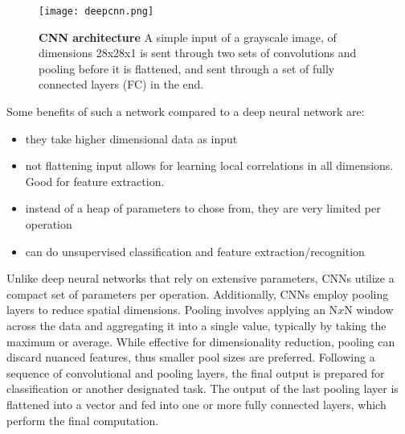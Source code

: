 \begin{figure}[H]
 \centering
 \texttt{[image: deepcnn.png]}
 \caption{\textbf{CNN architecture} A simple input of a grayscale image, of dimensions 28x28x1 is sent through two sets of convolutions and pooling before it is flattened, and sent through a set of fully connected layers (FC) in  the end.}
 \label{fig:cnn}
\end{figure}

Some benefits of such a network compared to a deep neural network are:
\begin{itemize}
 \item they take higher dimensional data as input
 \item not flattening input allows for learning local correlations in all dimensions. Good for feature extraction.
 \item instead of a heap of parameters to chose from, they are very limited per operation
 \item can do unsupervised classification and feature extraction/recognition
\end{itemize}

Unlike deep neural networks that rely on extensive parameters, CNNs utilize a compact set of parameters per operation. Additionally, CNNs employ pooling layers to reduce spatial dimensions. Pooling involves applying an N$x$N window across the data and aggregating it into a single value, typically by taking the maximum or average. While effective for dimensionality reduction, pooling can discard nuanced features, thus smaller pool sizes are preferred. Following a sequence of convolutional and pooling layers, the final output is prepared for classification or another designated task. The output of the last pooling layer is flattened into a vector and fed into one or more fully connected layers, which perform the final computation.



